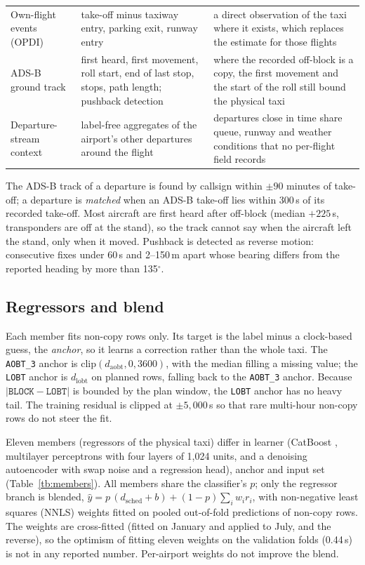 \documentclass[
  manuscript=article,
  layout=preprint,
  year=2026,
  volume=x,
]{extra/joas}
\newcommand{\fld}[1]{\texttt{#1}}
\begin{document}
\begin{table}[htbp!]
\begin{tabular}{L{0.2\textwidth}L{0.36\textwidth}L{0.36\textwidth}}
  Own-flight events (OPDI) & take-off minus taxiway entry, parking exit, runway entry & a direct observation of the taxi where it exists, which replaces the estimate for those flights \\
  ADS-B ground track & first heard, first movement, roll start, end of last stop, stops, path length; pushback detection & where the recorded off-block is a copy, the first movement and the start of the roll still bound the physical taxi \\
  Departure-stream context & label-free aggregates of the airport's other departures around the flight & departures close in time share queue, runway and weather conditions that no per-flight field records \\
  \bottomrule
  \end{tabular}
\end{table}

The ADS-B track of a departure is found by callsign within $\pm 90$ minutes of take-off; a departure is \emph{matched} when an ADS-B
take-off lies within 300\,s of its recorded take-off. Most aircraft are first heard after off-block (median $+225$\,s, transponders are
off at the stand), so the track cannot say when the aircraft left the stand, only when it moved. Pushback is detected as reverse motion:
consecutive fixes under 60\,s and 2--150\,m apart whose bearing differs from the reported heading by more than 135$^\circ$.

\subsection{Regressors and blend}
\label{sec:regressors}

Each member fits non-copy rows only. Its target is the label minus a clock-based guess, the \emph{anchor}, so it learns a correction
rather than the whole taxi. The \fld{AOBT\_3} anchor is $\mathrm{clip}(d_{\mathrm{aobt}}, 0, 3600)$, with the median filling a missing
value; the \fld{LOBT} anchor is $d_{\mathrm{lobt}}$ on planned rows, falling back to the \fld{AOBT\_3} anchor. Because $|\fld{BLOCK} -
\fld{LOBT}|$ is bounded by the plan window, the \fld{LOBT} anchor has no heavy tail. The training residual is clipped at $\pm 5{,}000$\,s
so that rare multi-hour non-copy rows do not steer the fit.

Eleven members (regressors of the physical taxi) differ in learner (CatBoost \cite{prokhorenkova2018catboost}, multilayer perceptrons with four layers of 1,024 units,
and a denoising autoencoder with swap noise \cite{vincent2008dae} and a regression head), anchor and input set (Table~\ref{tb:members}).
All members share the classifier's $p$; only the regressor branch is blended, $\hat{y} = p\,(d_{\mathrm{sched}} + b) + (1-p) \sum_i
w_i r_i$, with non-negative least squares (NNLS) weights \cite{lawson1974nnls} fitted on pooled out-of-fold predictions of non-copy rows.
The weights are cross-fitted (fitted on January and applied to July, and the reverse), so the optimism of fitting eleven weights on the
validation folds (0.44\,s) is not in any reported number. Per-airport weights do not improve the blend.
\end{document}
